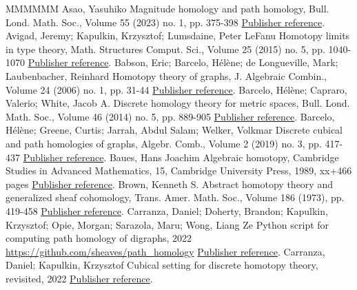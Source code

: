 \begin{thebibliography}{MMMMMM}
 Asao, Yasuhiko Magnitude homology and path homology, Bull. Lond. Math. Soc., Volume 55 (2023) no. 1, pp. 375-398 \href{https://alco.centre-mersenne.org/articles/10.5802/alco.341/#asao:magnitude-n-path}{Publisher reference}.
 Avigad, Jeremy; Kapulkin, Krzysztof; Lumsdaine, Peter LeFanu Homotopy limits in type theory, Math. Structures Comput. Sci., Volume 25 (2015) no. 5, pp. 1040-1070 \href{https://alco.centre-mersenne.org/articles/10.5802/alco.341/#avigad-kapulkin-lumsdaine}{Publisher reference}.
 Babson, Eric; Barcelo, Hélène; de Longueville, Mark; Laubenbacher, Reinhard Homotopy theory of graphs, J. Algebraic Combin., Volume 24 (2006) no. 1, pp. 31-44 \href{https://alco.centre-mersenne.org/articles/10.5802/alco.341/#babson-barcelo-longueville-laubenbacher}{Publisher reference}.
 Barcelo, Hélène; Capraro, Valerio; White, Jacob A. Discrete homology theory for metric spaces, Bull. Lond. Math. Soc., Volume 46 (2014) no. 5, pp. 889-905 \href{https://alco.centre-mersenne.org/articles/10.5802/alco.341/#barcelo-capraro-white}{Publisher reference}.
 Barcelo, Hélène; Greene, Curtis; Jarrah, Abdul Salam; Welker, Volkmar Discrete cubical and path homologies of graphs, Algebr. Comb., Volume 2 (2019) no. 3, pp. 417-437 \href{https://alco.centre-mersenne.org/articles/10.5802/alco.341/#barcelo-greene-jarraj-welker:discrete-path}{Publisher reference}.
 Baues, Hans Joachim Algebraic homotopy, Cambridge Studies in Advanced Mathematics, 15, Cambridge University Press, 1989, xx+466 pages \href{https://alco.centre-mersenne.org/articles/10.5802/alco.341/#baues:algebraic-homotopy}{Publisher reference}.
 Brown, Kenneth S. Abstract homotopy theory and generalized sheaf cohomology, Trans. Amer. Math. Soc., Volume 186 (1973), pp. 419-458 \href{https://alco.centre-mersenne.org/articles/10.5802/alco.341/#brown:abstract-homotopy-theory}{Publisher reference}.
 Carranza, Daniel; Doherty, Brandon; Kapulkin, Krzysztof; Opie, Morgan; Sarazola, Maru; Wong, Liang Ze Python script for computing path homology of digraphs, 2022 \url{https://github.com/sheaves/path_homology} \href{https://alco.centre-mersenne.org/articles/10.5802/alco.341/#python_script}{Publisher reference}.
 Carranza, Daniel; Kapulkin, Krzysztof Cubical setting for discrete homotopy theory, revisited, 2022 \href{https://alco.centre-mersenne.org/articles/10.5802/alco.341/#carranza-kapulkin:cubical-setting}{Publisher reference}.

\end{thebibliography}
